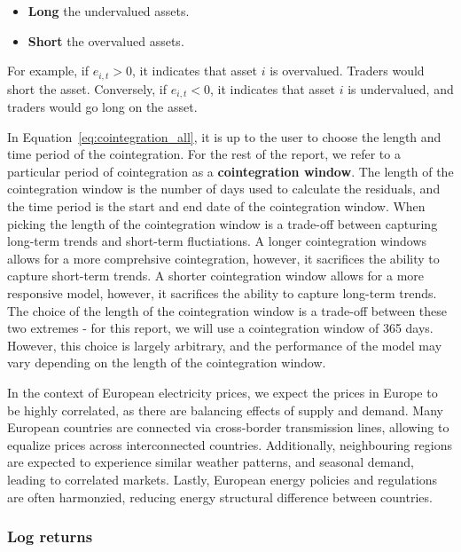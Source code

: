 \documentclass[12pt]{article}
\begin{document}
\begin{itemize}
  \item \textbf{Long} the undervalued assets.
  \item \textbf{Short} the overvalued assets.
\end{itemize}

For example, if $e_{i,t} > 0$, it indicates that asset $i$ is overvalued. Traders would short the asset. Conversely, if $e_{i,t} < 0$, it indicates that asset $i$ is undervalued, and traders would go long on the asset.

In Equation~\ref{eq:cointegration_all}, it is up to the user to choose the length and time period of the cointegration. For the rest of the report, we refer to a particular period of cointegration as a \textbf{cointegration window}. The length of the cointegration window is the number of days used to calculate the residuals, and the time period is the start and end date of the cointegration window.
When picking the length of the cointegration window is a trade-off between capturing long-term trends and short-term fluctiations. A longer cointegration windows allows for a more comprehsive cointegration, however, it sacrifices the ability to capture short-term trends. A shorter cointegration window allows for a more responsive model, however, it sacrifices the ability to capture long-term trends. The choice of the length of the cointegration window is a trade-off between these two extremes - for this report, we will use a cointegration window of 365 days. However, this choice is largely arbitrary, and the performance of the model may vary depending on the length of the cointegration window.  

In the context of European electricity prices, we expect the prices in Europe to be highly correlated, as there are balancing effects of supply and demand. Many European countries are connected via cross-border transmission lines, allowing to equalize prices across interconnected countries. Additionally, neighbouring regions are expected to experience similar weather patterns, and seasonal demand, leading to correlated markets. Lastly, European energy policies and regulations are often harmonzied, reducing energy structural difference between countries.

\subsubsection{Log returns}
\end{document}
